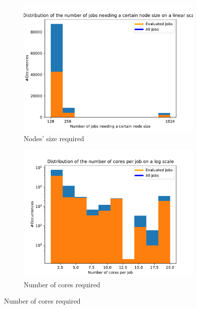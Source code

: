\documentclass[a4paper]{article}
\begin{document}
\begin{figure}[H]
\begin{subfigure}[b]{0.4\linewidth}\centering\includegraphics[width=1\linewidth]{MBSS/plot/Distribution/2022-01-17->2022-01-19_data_size.pdf}\caption{Nodes' size required}\label{40}\end{subfigure}
\begin{subfigure}[b]{0.4\linewidth}\centering\includegraphics[width=1\linewidth]{MBSS/plot/Distribution/2022-01-17->2022-01-19_cores.pdf}\caption{Number of cores required}\label{41}\end{subfigure}

\end{figure}
\end{document}
